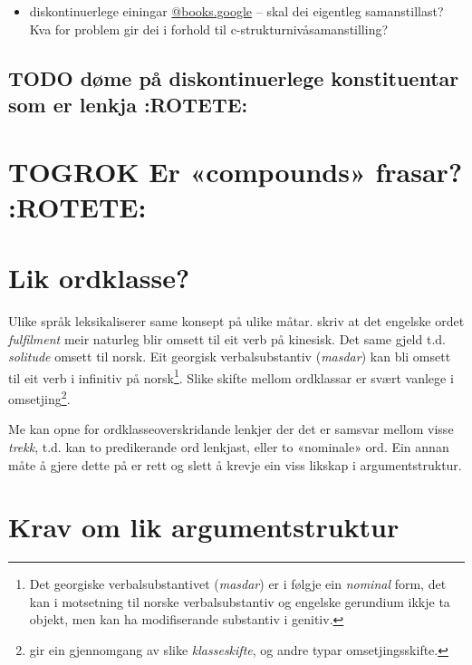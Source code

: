 \documentclass[11pt,a4paper,oneside,draft]{book}
\begin{document}
\begin{itemize}
\item diskontinuerlege einingar \cite[s.~4]{cheung2002scg}
     \href{http://scholar.google.no/scholar.bib%3Fhl%3Dno&lr%3D&ie%3DUTF-8&q%3Dinfo:Qh_MRSftNZgJ:scholar.google.com/&output%3Dcitation&oe%3DMACINTOSH&oi%3Dcitation}{@books.google} -- skal dei eigentleg samanstillast? Kva for problem
     gir dei i forhold til c-strukturnivåsamanstilling?
\end{itemize}
\subsection{\textbf{TODO} døme på diskontinuerlege konstituentar som er lenkja \textbf{:ROTETE:}}
\label{sec-3.12.1}

\section{\textbf{TOGROK} Er «compounds» frasar? \textbf{:ROTETE:}}
\label{sec-3.13}

 \citep[p.~1]{giegerich2006aea}


\section{Lik ordklasse?}
\label{sec-3.14}

Ulike språk leksikaliserer same konsept på ulike
måtar. \citet[s.~3]{cheung2002scg} skriv at det engelske ordet
\emph{fulfilment} meir naturleg blir omsett til eit verb på kinesisk. Det
same gjeld t.d. \emph{solitude} omsett til norsk. Eit georgisk
verbalsubstantiv (\emph{masdar}) kan bli omsett til eit verb i infinitiv på
norsk\footnote{Det georgiske verbalsubstantivet (\emph{masdar}) er i følgje
        \citet[kap.~2.5]{aronson1990grg} ein \emph{nominal} form, det kan i
        motsetning til norske verbalsubstantiv og engelske gerundium
        ikkje ta objekt, men kan ha modifiserande substantiv i
        genitiv. }. Slike skifte mellom ordklassar er svært vanlege i
omsetjing\footnote{\citet[Catford~(1965),~i][s.~61]{munday2001its} gir ein gjennomgang av
slike \emph{klasseskifte}, og andre typar omsetjingsskifte. }.

Me kan opne for ordklasseoverskridande lenkjer der det er samsvar
mellom visse \emph{trekk}, t.d. kan to predikerande ord lenkjast, eller to
«nominale» ord. Ein annan måte å gjere dette på er rett og slett å
krevje ein viss likskap i argumentstruktur. 


\section{Krav om lik argumentstruktur}
\label{sec-3.15}
\end{document}
